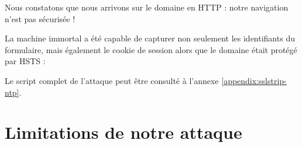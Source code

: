 Nous constatons que nous arrivons sur le domaine  en HTTP : notre navigation n'est pas sécurisée !

\begin{figure}[H]
\end{figure}

La machine immortal a été capable de capturer non seulement les identifiants du formulaire, mais également le cookie de session alors que le domaine était protégé par HSTS :

\begin{figure}[H]
\end{figure}

Le script complet de l'attaque peut être consulté à l'annexe \ref{appendix:sslstrip-ntp}.

\section{Limitations de notre attaque}

